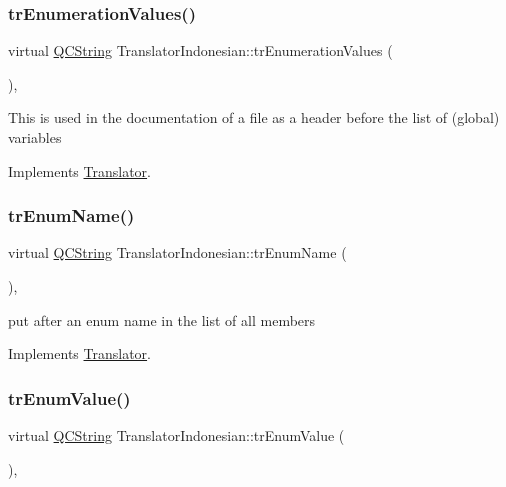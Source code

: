 \subsubsection{\texorpdfstring{trEnumerationValues()}{trEnumerationValues()}}
{\footnotesize\ttfamily virtual \mbox{\hyperlink{class_q_c_string}{Q\+C\+String}} Translator\+Indonesian\+::tr\+Enumeration\+Values (\begin{DoxyParamCaption}{ }\end{DoxyParamCaption})\hspace{0.3cm}{\ttfamily [inline]}, {\ttfamily [virtual]}}

This is used in the documentation of a file as a header before the list of (global) variables 

Implements \mbox{\hyperlink{class_translator}{Translator}}.

\mbox{\label{class_translator_indonesian_a7d9ba2fd57d117ea9566d5ab240e6777}} 
\subsubsection{\texorpdfstring{trEnumName()}{trEnumName()}}
{\footnotesize\ttfamily virtual \mbox{\hyperlink{class_q_c_string}{Q\+C\+String}} Translator\+Indonesian\+::tr\+Enum\+Name (\begin{DoxyParamCaption}{ }\end{DoxyParamCaption})\hspace{0.3cm}{\ttfamily [inline]}, {\ttfamily [virtual]}}

put after an enum name in the list of all members 

Implements \mbox{\hyperlink{class_translator}{Translator}}.

\mbox{\label{class_translator_indonesian_adc5560db715fad24920544df6e847386}} 
\subsubsection{\texorpdfstring{trEnumValue()}{trEnumValue()}}
{\footnotesize\ttfamily virtual \mbox{\hyperlink{class_q_c_string}{Q\+C\+String}} Translator\+Indonesian\+::tr\+Enum\+Value (\begin{DoxyParamCaption}{ }\end{DoxyParamCaption})\hspace{0.3cm}{\ttfamily [inline]}, {\ttfamily [virtual]}}

